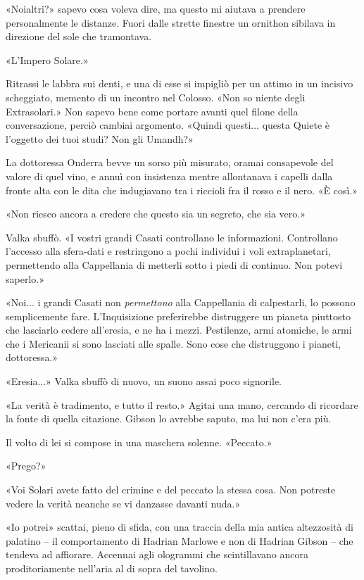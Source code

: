 «Noialtri?» sapevo cosa voleva dire, ma questo mi aiutava a prendere
personalmente le distanze. Fuori dalle strette finestre un ornithon
sibilava in direzione del sole che tramontava.

«L'Impero Solare.»

Ritrassi le labbra sui denti, e una di esse si impigliò per un attimo in
un incisivo scheggiato, memento di un incontro nel Colosso. «Non so
niente degli Extrasolari.» Non sapevo bene come portare avanti quel
filone della conversazione, perciò cambiai argomento. «Quindi questi...
questa Quiete è l'oggetto dei tuoi studi? Non gli Umandh?»

La dottoressa Onderra bevve un sorso più misurato, oramai consapevole
del valore di quel vino, e annuì con insistenza mentre allontanava i
capelli dalla fronte alta con le dita che indugiavano tra i riccioli fra
il rosso e il nero. «È così.»

«Non riesco ancora a credere che questo sia un segreto, che sia vero.»

Valka sbuffò. «I vostri grandi Casati controllano le informazioni.
Controllano l'accesso alla sfera-dati e restringono a pochi individui i
voli extraplanetari, permettendo alla Cappellania di metterli sotto i
piedi di continuo. Non potevi saperlo.»

«Noi... i grandi Casati non \emph{permettono} alla Cappellania di
calpestarli, lo possono semplicemente fare. L'Inquisizione preferirebbe
distruggere un pianeta piuttosto che lasciarlo cedere all'eresia, e ne
ha i mezzi. Pestilenze, armi atomiche, le armi che i Mericanii si sono
lasciati alle spalle. Sono cose che distruggono i pianeti, dottoressa.»

«Eresia...» Valka sbuffò di nuovo, un suono assai poco signorile.

«La verità è tradimento, e tutto il resto.» Agitai una mano, cercando di
ricordare la fonte di quella citazione. Gibson lo avrebbe saputo, ma lui
non c'era più.

Il volto di lei si compose in una maschera solenne. «Peccato.»

«Prego?»

«Voi Solari avete fatto del crimine e del peccato la stessa cosa. Non
potreste vedere la verità neanche se vi danzasse davanti nuda.»

«Io potrei» scattai, pieno di sfida, con una traccia della mia antica
altezzosità di palatino -- il comportamento di Hadrian Marlowe e non di
Hadrian Gibson -- che tendeva ad affiorare. Accennai agli ologrammi che
scintillavano ancora proditoriamente nell'aria al di sopra del tavolino.

